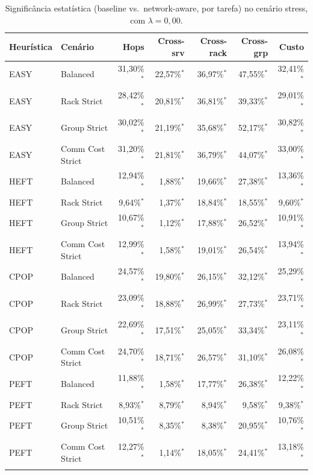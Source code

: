 \begin{table}[htbp]
\centering
\small
\caption{Significância estatística (baseline vs.\ network-aware, por tarefa) no cenário stress, com $\lambda = 0{,}00$.}
\label{tab:significancia_stress_lambda_000}
\begin{tabular}{llrrrrr}
\toprule
Heurística & Cenário & Hops & Cross-srv & Cross-rack & Cross-grp & Custo \\
\midrule
EASY & Balanced & 31,30\%$^{*}$ & 22,57\%$^{*}$ & 36,97\%$^{*}$ & 47,55\%$^{*}$ & 32,41\%$^{*}$ \\
EASY & Rack Strict & 28,42\%$^{*}$ & 20,81\%$^{*}$ & 36,81\%$^{*}$ & 39,33\%$^{*}$ & 29,01\%$^{*}$ \\
EASY & Group Strict & 30,02\%$^{*}$ & 21,19\%$^{*}$ & 35,68\%$^{*}$ & 52,17\%$^{*}$ & 30,82\%$^{*}$ \\
EASY & Comm Cost Strict & 31,20\%$^{*}$ & 21,81\%$^{*}$ & 36,79\%$^{*}$ & 44,07\%$^{*}$ & 33,00\%$^{*}$ \\
\addlinespace
HEFT & Balanced & 12,94\%$^{*}$ & 1,88\%$^{*}$ & 19,66\%$^{*}$ & 27,38\%$^{*}$ & 13,36\%$^{*}$ \\
HEFT & Rack Strict & 9,64\%$^{*}$ & 1,37\%$^{*}$ & 18,84\%$^{*}$ & 18,55\%$^{*}$ & 9,60\%$^{*}$ \\
HEFT & Group Strict & 10,67\%$^{*}$ & 1,12\%$^{*}$ & 17,88\%$^{*}$ & 26,52\%$^{*}$ & 10,91\%$^{*}$ \\
HEFT & Comm Cost Strict & 12,99\%$^{*}$ & 1,58\%$^{*}$ & 19,01\%$^{*}$ & 26,54\%$^{*}$ & 13,94\%$^{*}$ \\
\addlinespace
CPOP & Balanced & 24,57\%$^{*}$ & 19,80\%$^{*}$ & 26,15\%$^{*}$ & 32,12\%$^{*}$ & 25,29\%$^{*}$ \\
CPOP & Rack Strict & 23,09\%$^{*}$ & 18,88\%$^{*}$ & 26,99\%$^{*}$ & 27,73\%$^{*}$ & 23,71\%$^{*}$ \\
CPOP & Group Strict & 22,69\%$^{*}$ & 17,51\%$^{*}$ & 25,05\%$^{*}$ & 33,34\%$^{*}$ & 23,11\%$^{*}$ \\
CPOP & Comm Cost Strict & 24,70\%$^{*}$ & 18,71\%$^{*}$ & 26,57\%$^{*}$ & 31,10\%$^{*}$ & 26,08\%$^{*}$ \\
\addlinespace
PEFT & Balanced & 11,88\%$^{*}$ & 1,58\%$^{*}$ & 17,77\%$^{*}$ & 26,38\%$^{*}$ & 12,22\%$^{*}$ \\
PEFT & Rack Strict & 8,93\%$^{*}$ & 8,79\%$^{*}$ & 8,94\%$^{*}$ & 9,58\%$^{*}$ & 9,38\%$^{*}$ \\
PEFT & Group Strict & 10,51\%$^{*}$ & 8,35\%$^{*}$ & 8,38\%$^{*}$ & 20,95\%$^{*}$ & 10,76\%$^{*}$ \\
PEFT & Comm Cost Strict & 12,27\%$^{*}$ & 1,14\%$^{*}$ & 18,05\%$^{*}$ & 24,41\%$^{*}$ & 13,18\%$^{*}$ \\
\addlinespace
\bottomrule
\end{tabular}


\end{table}
